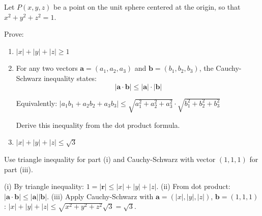 \begin{problem}
Let $P(x,y,z)$ be a point on the unit sphere centered at the origin, so that $x^2 + y^2 + z^2 = 1$.

Prove:
\begin{enumerate}[label=(\roman*)]
    \item $|x| + |y| + |z| \geq 1$
    
    \item For any two vectors $\mathbf{a} = (a_1, a_2, a_3)$ and $\mathbf{b} = (b_1, b_2, b_3)$, the Cauchy-Schwarz inequality states:
    $$|\mathbf{a} \cdot \mathbf{b}| \leq |\mathbf{a}| \cdot |\mathbf{b}|$$
    
    Equivalently: $|a_1b_1 + a_2b_2 + a_3b_3| \leq \sqrt{a_1^2 + a_2^2 + a_3^2} \cdot \sqrt{b_1^2 + b_2^2 + b_3^2}$
    
    Derive this inequality from the dot product formula.
    
    \item $|x| + |y| + |z| \leq \sqrt{3}$
\end{enumerate}
\end{problem}

\begin{hint}
Use triangle inequality for part (i) and Cauchy-Schwarz with vector $(1,1,1)$ for part (iii).
\end{hint}

\begin{solution}[Sketch]
(i) By triangle inequality: $1 = |\mathbf{r}| \leq |x| + |y| + |z|$. (ii) From dot product: $|\mathbf{a} \cdot \mathbf{b}| \leq |\mathbf{a}||\mathbf{b}|$. (iii) Apply Cauchy-Schwarz with $\mathbf{a} = (|x|,|y|,|z|)$, $\mathbf{b} = (1,1,1)$: $|x| + |y| + |z| \leq \sqrt{x^2+y^2+z^2}\sqrt{3} = \sqrt{3}$.
\end{solution}

\vspace{1em}

